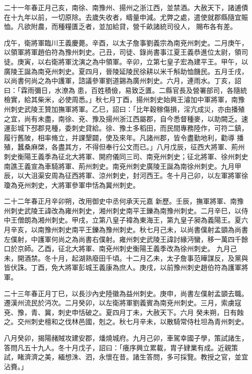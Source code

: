 \begin{pinyinscope}
 二十一年春正月己亥，南徐、南豫州、揚州之浙江西，並禁酒。大赦天下，諸逋債在十九年以前，一切原除。去歲失收者，疇量申減。尤弊之處，遣使就郡縣隨宜賑恤。凡欲附農，而種糧匱乏者，並加給貸，營千畝諸統司役人，
 賜布各有差。



 戊午，衛將軍臨川王義慶薨。辛酉，以太子詹事劉義宗為南兗州刺史。二月庚午，以領軍將軍趙伯符為豫州刺史。己丑，司徒、錄尚書事江夏王義恭進位太尉，領司徒。庚寅，以右衛將軍沈演之為中領軍。辛卯，立第七皇子宏為建平王。甲午，以廣陵王誕為南兗州刺史。夏四月，晉陵延陵民徐耕以米千斛助恤饑民。五月壬戌，以尚書何尚之為中護軍，諮議參軍劉道錫為廣州刺史。六月，連雨水。丁亥，詔曰：「霖雨彌日，水潦為
 患，百姓積儉，易致乏匱。二縣官長及營署部司，各隨統檢實，給其柴米，必使周悉。」秋七月丁酉，揚州刺史始興王濬加中軍將軍，南豫州刺史武陵王贊加撫軍將軍。乙巳，詔曰：「比年穀稼傷損，淫亢成災，亦由播殖之宜，尚有未盡，南徐、兗、豫及揚州浙江西屬郡，自今悉督種麥，以助闕乏。速運彭城下邳郡見種，委刺史貸給。徐、豫土多稻田，而民間專務陸作，可符二鎮，履行舊陂，相率脩立，并課墾闢，使及來年。凡諸州郡，皆令盡勤地利，勸導
 播殖，蠶桑麻棨，各盡其方，不得但奉行公文而已。」八月戊辰，征西大將軍、荊州刺史衡陽王義季為征北大將軍、開府儀同三司、南兗州刺史；征北將軍、徐州刺史南譙王義宣為車騎將軍、荊州刺史。南兗州刺史廣陵王誕為南徐州刺史。九月甲辰，以大沮渠安周為征西將軍、涼州刺史，封河西王。冬十月己卯，以左軍將軍徐瓊為兗州刺史，大將軍參軍申恬為冀州刺史。



 二十二年春正月辛卯朔，改用御史中丞何承天元嘉
 新歷。壬辰，撫軍將軍、南豫州刺史武陵王諱改為雍州刺史，湘州刺史南平王鑠為南豫州刺史。二月辛巳，以侍中王僧朗為湘州刺史。甲戌，立第八皇子褘為東海王，第九皇子昶為義陽王。夏六月辛亥，以南豫州刺史南平王鑠為豫州刺史。秋七月己未，以尚書僕射孟顗為尚書左僕射，中護軍何尚之為尚書右僕射。雍州刺史武陵王諱討緣沔蠻，移一萬四千餘口於京師。乙酉，征北大將軍、南兗州刺史衡陽王義季改為徐州刺史。
 九月己未，開酒禁。冬十月，起湖熟廢田千頃。十二月乙未，太子詹事范曄謀反，及黨與皆伏誅。丁酉，免大將軍彭城王義康為庶人。庚戌，以前豫州刺史趙伯符為護軍將軍。



 二十三年春正月丁巳，以長沙內史陸徽為益州刺史。庚申，尚書左僕射孟顗去職。遷漢州流民於沔次。二月癸卯，以左衛將軍劉義賓為南兗州刺史。三月，索虜寇兗、豫，青、冀，刺史申恬破之。夏四月丁未，大赦天下。六月
 癸未朔，日有蝕之。交州刺史檀和之伐林邑國，剋之。秋七月辛未，以散騎常侍杜坦為青州刺史。



 八月癸卯，揭陽赭賊攻建安郡，燔燒城府。九月己卯，車駕幸國子學，策試諸生，答問凡五十九人。冬十月戊子，詔曰：「癢序興立累載，胄子肄業有成。近親策試，睹濟濟之美，緬想洙、泗，永懷在昔。諸生答問，多可採覽。教授之官，並宜沾賚。」




\end{pinyinscope}
